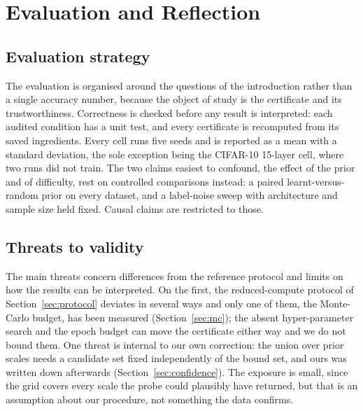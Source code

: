 \section{Evaluation and Reflection}\label{sec:evaluation}

\subsection{Evaluation strategy}\label{sec:evalstrategy}

The evaluation is organised around the questions of the introduction rather than
a single accuracy number, because the object of study is the certificate and its
trustworthiness. Correctness is checked before any result is interpreted: each
audited condition has a unit test, and every certificate is recomputed from its
saved ingredients. Every cell runs five seeds and is reported as a mean with a
standard deviation, the sole exception being the CIFAR-10 15-layer cell, where
two runs did not train. The two claims easiest to confound, the effect of the
prior and of difficulty, rest on controlled comparisons instead: a paired
learnt-versus-random prior on every dataset, and a label-noise sweep with
architecture and sample size held fixed. Causal claims are restricted to those.

\subsection{Threats to validity}\label{sec:threats}

The main threats concern differences from the reference protocol and limits on
how the results can be interpreted. On the first, the reduced-compute protocol of
Section~\ref{sec:protocol} deviates in several ways and only one of them, the
Monte-Carlo budget, has been measured (Section~\ref{sec:mc}); the absent
hyper-parameter search and the epoch budget can move the certificate either way
and we do not bound them. One threat is internal to our own correction: the union
over prior scales needs a candidate set fixed independently of the bound set, and
ours was written down afterwards (Section~\ref{sec:confidence}). The exposure is
small, since the grid covers every scale the probe could plausibly have returned,
but that is an assumption about our procedure, not something the data confirms.

